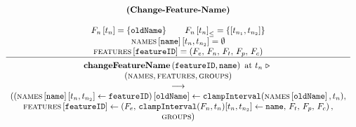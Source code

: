 \begin{figure}
    \renewcommand{\arraystretch}{1.1}
    \sossize$$\begin{array}{c}
      \ntyperule{Change-Feature-Name}
      {\\
        \lookup{F_n}{t_n} = \set{\var{oldName}} \qquad
        \containing{F_n}{t_n} = \set{\interval{t_{n_1}}{t_{n_2}}} \\
        \lookup{\names{}}{\var{name}}\interval{t_n}{t_{n_2}} = \emptyset \\
        \lookup{\features{}}{\var{featureID}} = \left( F_e,\, F_n,\, F_t,\, F_p,\, F_c \right)
      }
      {
        \textbf{changeFeatureName}\left( \var{featureID}, \var{name}\right) \text{ at } t_n \shove \\
        (\names{}, \features{}, \groups{}) \\
        \transition \\
        (\lookup{\left(\lookup{\names{}}{\var{name}}\interval{t_n}{t_{n_2}} \assign \var{featureID}\right)}{\var{oldName}} \assign \var{clampInterval}(\lookup{\names}{\var{oldName}}, t_n), \\
        \lookup{\features{}}{\var{featureID}} \assign \left( F_e,\, \var{clampInterval}(F_n, t_n)\interval{t_n}{t_{n_2}} \assign \var{name},\, F_t,\, F_p,\, F_c \right), \\
        \groups{})
      }
    \end{array}$$
  \caption{\label{rule:change-feature-name}}
\end{figure}
